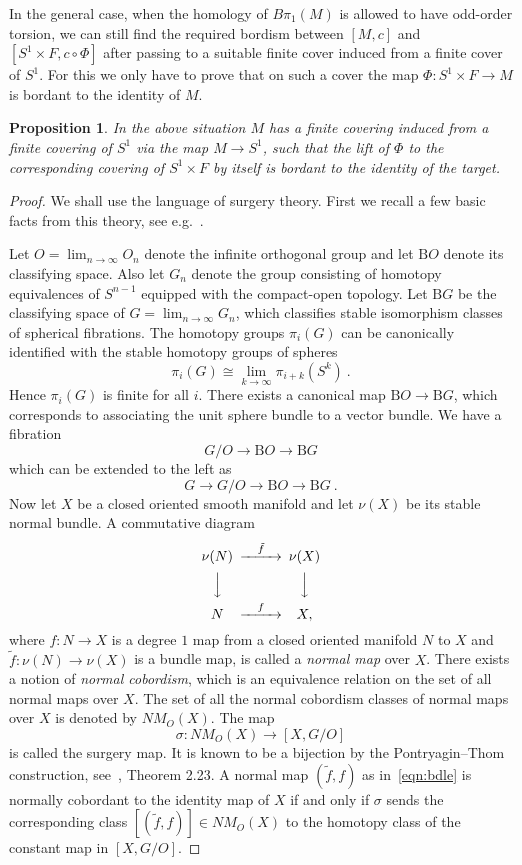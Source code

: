\documentclass[12pt]{amsart}
\newtheorem{proposition}[theorem]{Proposition}
\theoremstyle{definition}
\theoremstyle{remark}
\def\lra{{\longrightarrow}}
\begin{document}
   In the general case, when the homology of $B\pi_1(M)$ is allowed to have odd-order
    torsion, we can still find the required bordism between $[M,c]$ and $[S^{1}\times F,c\circ\Phi ]$
    after passing to a suitable finite cover induced from a finite cover of $S^1$. For this we only have to prove
    that on such a cover the map $\Phi\colon S^1\times F\longrightarrow M$ is bordant to the 
    identity of $M$.
\begin{proposition}\label{p:surgery}
In the above situation $M$ has a finite covering induced from a finite covering of $S^1$ via the map
$M\longrightarrow S^1$, such that the lift of $\Phi$ to the corresponding covering of $S^1\times F$
by itself is bordant to the identity of the target.
\end{proposition}
\begin{proof}
We shall use the language of surgery theory.
First we recall a few basic facts from this theory, see e.g.~\cite{MM}.

Let $O=\lim_{n\to\infty} O_n$ denote the
infinite orthogonal group and let $\mathrm{B}O$ denote its
classifying space. Also let $G_n$ denote the group consisting of
homotopy equivalences of $S^{n-1}$ equipped with the compact-open
topology. Let $\mathrm{B}G$ be the classifying space of
$G=\lim_{n\to\infty} G_n$, which classifies stable
isomorphism classes of spherical fibrations.
The homotopy groups $\pi_i (G)$ can be canonically identified
with the stable homotopy groups of spheres
$$
\pi_i (G)\cong \lim_{k\to\infty} \pi_{i+k} (S^k) \ .
$$
Hence $\pi_i (G)$ is finite for all $i$.
There exists a canonical map
$\mathrm{B}O\to \mathrm{B}G$, which corresponds to associating
the unit sphere bundle to a vector bundle.
We have a fibration
$$
G/O\lra \mathrm{B}O\lra \mathrm{B}G
$$
which can be extended to the left as
$$
G\lra G/O\lra \mathrm{B}O\lra \mathrm{B}G \ .
$$
Now let $X$ be a closed oriented smooth manifold and let $\nu(X)$ be
its stable normal bundle. A commutative diagram
\begin{equation}
\begin{CD}
\nu(N) @>{\tilde f}>> \nu(X)\\
@VVV @VVV\\
N @>{f}>> X,
\end{CD}
\label{eqn:bdle}
\end{equation}
where $f\colon N\to X$ is a degree $1$ map from a closed
oriented manifold $N$ to $X$ and $\tilde f\colon\nu(N)\to\nu(X)$
is a bundle map, is called a {\it normal map} over $X$.
There exists a notion of {\it normal cobordism}, which is an
equivalence relation on the set of all normal maps over $X$.
The set of all the normal cobordism classes of normal maps
over $X$ is denoted by $NM_O(X)$. The map
$$
\sigma\colon NM_O(X)\lra [X,G/O]
$$
is called the surgery map. It is known to be a bijection by the Pontryagin--Thom
construction, see~\cite{MM}, Theorem 2.23. A normal map
$(\tilde f, f)$ as in~\eqref{eqn:bdle} is normally cobordant
to the identity map of $X$ if and only if $\sigma$
sends the corresponding class $[(\tilde f, f)]\in NM_O(X)$
to the homotopy class of the constant map in $[X,G/O]$.


\end{proof}
\end{document}
